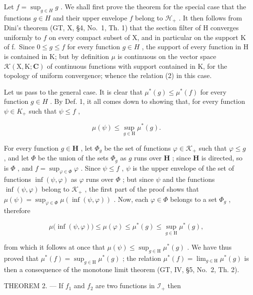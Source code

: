 Let \(f = \sup_{g \in H} g\) . We shall first prove the theorem for the special case that the functions \(g \in H\) and their upper envelope \(f\) belong to \(\mathcal{H}_+\) . It then follows from Dini's theorem (GT, X, §4, No.~1, Th. 1) that the section filter of H converges uniformly to \(f\) on every compact subset of X, and in particular on the support K of f.~Since \(0 \leqslant g \leqslant f\) for every function \(g \in H\) , the support of every function in H is contained in K; but by definition \(\mu\) is continuous on the vector space \(\mathcal{K}(\mathrm{X},\mathrm{K};\mathbf{C})\) of continuous functions with support contained in K, for the topology of uniform convergence; whence the relation (2) in this case.

Let us pass to the general case. It is clear that \(\mu^{*}(g) \leqslant \mu^{*}(f)\) for every function \(g \in H\) . By Def. 1, it all comes down to showing that, for every function \(\psi \in K_{+}\) such that \(\psi \leqslant f\) ,

\[
\mu (\psi) \leqslant \sup _ {g \in \mathrm{H}} \mu^ {*} (g).
\]

For every function \(g \in \mathbf{H}\) , let \(\Phi_g\) be the set of functions \(\varphi \in \mathcal{K}_+\) such that \(\varphi \leqslant g\) , and let \(\Phi\) be the union of the sets \(\Phi_g\) as \(g\) runs over \(\mathbf{H}\) ; since \(\mathbf{H}\) is directed, so is \(\Phi\) , and \(f = \sup_{\varphi \in \Phi} \varphi\) . Since \(\psi \leqslant f\) , \(\psi\) is the upper envelope of the set of functions \(\inf(\psi, \varphi)\) as \(\varphi\) runs over \(\Phi\) ; but since \(\psi\) and the functions \(\inf(\psi, \varphi)\) belong to \(\mathcal{K}_+\) , the first part of the proof shows that \(\mu(\psi) = \sup_{\varphi \in \Phi} \mu(\inf(\psi, \varphi))\) . Now, each \(\varphi \in \Phi\) belongs to a set \(\Phi_g\) , therefore

\[
\mu \big (\inf (\psi , \varphi) \big) \leqslant \mu (\varphi) \leqslant \mu^ {*} (g) \leqslant \sup _ {g \in \mathrm{H}} \mu^ {*} (g),
\]

from which it follows at once that \(\mu(\psi) \leqslant \sup_{g \in \mathrm{H}} \mu^{*}(g)\) . We have thus proved that \(\mu^{*}(f) = \sup_{g \in \mathrm{H}} \mu^{*}(g)\) ; the relation \(\mu^{*}(f) = \lim_{g \in \mathrm{H}} \mu^{*}(g)\) is then a consequence of the monotone limit theorem (GT, IV, §5, No.~2, Th. 2).

THEOREM 2. --- If \(f_1\) and \(f_2\) are two functions in \(\mathcal{I}_+\) then

